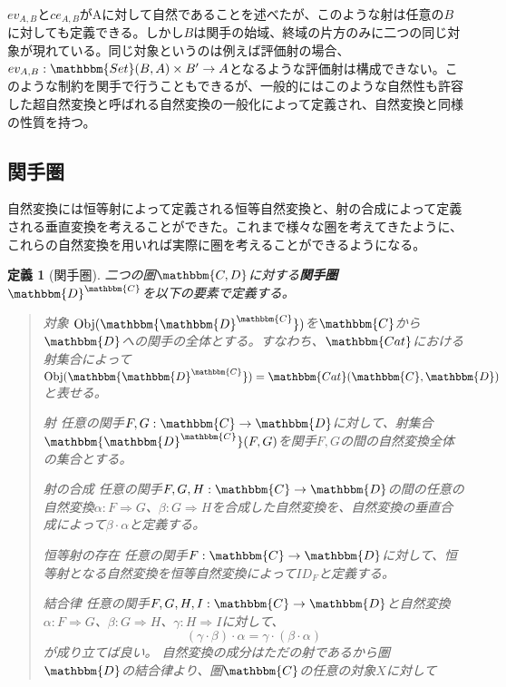 \documentclass[uplatex,dvipdfmx]{jsarticle}
\newcommand{\cat}[1]{\mathbbm{#1}}
\newcommand{\arrow}{\rightarrow}
\newcommand{\functor}[3]{#1:\cat{#2}\arrow \cat{#3}}
\newcommand{\nat}[3]{#1:#2\Rightarrow #3}
\newcommand{\obj}[1]{\mathrm{Obj}(\cat{#1})}
\newcommand{\mor}[3]{#1:#2\arrow #3}
\newcommand{\arset}[3]{\cat{#1}(#2,#3)}
\newcommand{\funccat}[2]{\cat{#2}^\cat{#1}}
\newtheorem{define}[proof]{定義}
\numberwithin{proof}{subsection}
\newenvironment{mydescription}
{\begin{description}
  \setlength{\parskip}{0.5cm}
}
{\end{description}}
\begin{document}
  $ev_{A,B}$と$ce_{A,B}$がAに対して自然であることを述べたが、このような射は任意の$B$に対しても定義できる。しかし$B$は関手の始域、終域の片方のみに二つの同じ対象が現れている。同じ対象というのは例えば評価射の場合、$\mor{ev_{A,B}}{\arset{Set}{B}{A}\times B'}{A}$となるような評価射は構成できない。このような制約を関手で行うこともできるが、一般的にはこのような自然性も許容した超自然変換と呼ばれる自然変換の一般化によって定義され、自然変換と同様の性質を持つ。
	\subsection{関手圏}
	自然変換には恒等射によって定義される恒等自然変換と、射の合成によって定義される垂直変換を考えることができた。これまで様々な圏を考えてきたように、これらの自然変換を用いれば実際に圏を考えることができるようになる。
	\begin{define}[関手圏]
		二つの圏$\cat{C,D}$に対する\textbf{関手圏}$\funccat{C}{D}$を以下の要素で定義する。
		\begin{quote}
			\begin{mydescription}
				\item[対象] $\obj{\funccat{C}{D}}$を$\cat{C}$から$\cat{D}$への関手の全体とする。すなわち、$\cat{Cat}$における射集合によって$\obj{\funccat{C}{D}}=\arset{Cat}{\cat{C}}{\cat{D}}$と表せる。
				\item[射]任意の関手$\functor{F,G}{C}{D}$に対して、射集合$\arset{\funccat{C}{D}}{F}{G}$を関手$F,G$の間の自然変換全体の集合とする。
				\item[射の合成] 任意の関手$\functor{F,G,H}{C}{D}$の間の任意の自然変換$\nat{\alpha}{F}{G}$、$\nat{\beta}{G}{H}$を合成した自然変換を、自然変換の垂直合成によって$\beta\cdot\alpha$と定義する。
				\item[恒等射の存在]任意の関手$\functor{F}{C}{D}$に対して、恒等射となる自然変換を恒等自然変換によって$ID_F$と定義する。
				\item[結合律]任意の関手$\functor{F,G,H,I}{C}{D}$と自然変換$\nat{\alpha}{F}{G}$、$\nat{\beta}{G}{H}$、$\nat{\gamma}{H}{I}$に対して、\[(\gamma\cdot\beta)\cdot\alpha=\gamma\cdot(\beta\cdot\alpha)\]が成り立てば良い。
				自然変換の成分はただの射であるから圏$\cat{D}$の結合律より、圏$\cat{C}$の任意の対象$X$に対して


\end{mydescription}
\end{quote}
\end{define}
\end{document}
